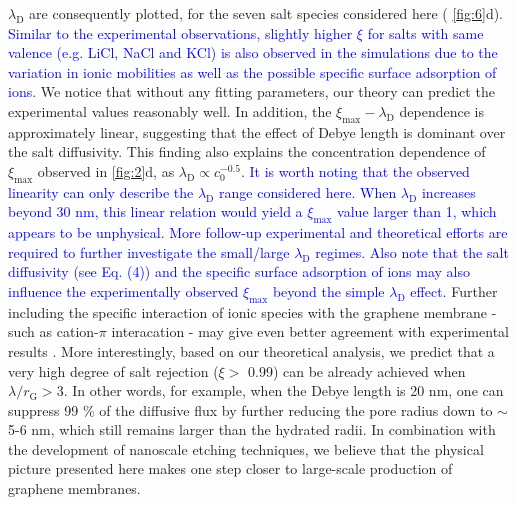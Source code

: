 $\lambda_{\mathrm{D}}$ are consequently plotted, for the seven salt
species considered here (\Fig{} \ref{fig:6}d).  \textcolor{blue}{
  Similar to the experimental observations, slightly higher $\xi$ for
  salts with same valence (e.g. LiCl, NaCl and KCl) is also observed
  in the simulations due to the variation in ionic mobilities as well
  as the possible specific surface adsorption of ions.} We notice that
without any fitting parameters, our theory can predict the
experimental values reasonably well.  In addition, the
$\xi_{\mathrm{max}}-\lambda_{\mathrm{D}}$ dependence is approximately
linear, suggesting that the effect of Debye length is dominant over
the salt diffusivity.
This
finding also explains the concentration dependence of
$\xi_{\mathrm{max}}$ observed in \Fig{} \ref{fig:2}d, as
$\lambda_{\mathrm{D}} \propto c_{0}^{-0.5}$.
\textcolor{blue}{It is worth noting that the
  observed linearity can only describe the $\lambda_{\mathrm{D}}$
  range considered here. When $\lambda_{\mathrm{D}}$ increases beyond
  30 nm, this linear relation would yield a $\xi_{\mathrm{max}}$
  value larger than 1, which appears to be unphysical.  More follow-up
  experimental and theoretical efforts are required to further
  investigate the small/large $\lambda_{\mathrm{D}}$ regimes. Also
  note that the salt diffusivity (see Eq. (4)) and the specific
  surface adsorption of ions may also influence the experimentally
  observed $\xi_{\mathrm{max}}$ beyond the simple
  $\lambda_{\mathrm{D}}$ effect.}
 Further including the
specific interaction of ionic species with the graphene membrane {-
  such as cation-$\pi$ interacation \cite{shi2013ion}} - may give even
better agreement with experimental results \cite{Ghosh_2018}. More
interestingly, based on our theoretical analysis, we predict that a
very high degree of salt rejection ($\xi>$ 0.99) can be already
achieved when $\lambda / r_{\mathrm{G}}>$3. In other words, for
example, when the Debye length is 20 nm, one can suppress 99 \% of the
diffusive flux by further reducing the pore radius down to $\sim$5-6
nm, which still remains larger than the hydrated radii. In combination
with the development of nanoscale etching techniques, we believe that
the physical picture presented here makes one step closer to
large-scale production of graphene membranes.

